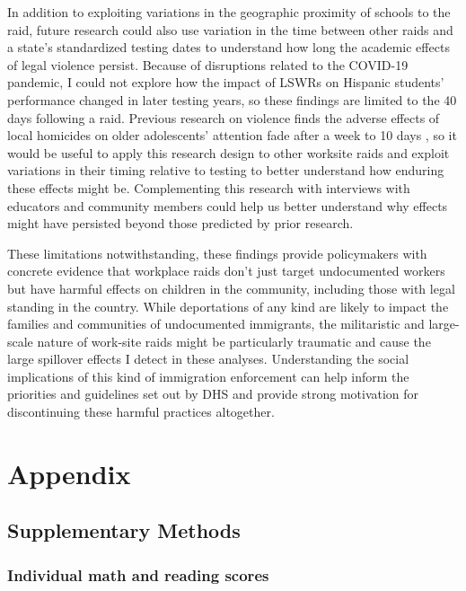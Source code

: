 \documentclass[hidelinks,twoside]{article}
\begin{document}
In addition to exploiting variations in the geographic proximity of schools to the raid, future research could also use variation in the time between other raids and a state's standardized testing dates to understand how long the academic effects of legal violence persist. Because of disruptions related to the COVID-19 pandemic, I could not explore how the impact of LSWRs on Hispanic students' performance changed in later testing years, so these findings are limited to the 40 days following a raid. Previous research on violence finds the adverse effects of local homicides on older adolescents' attention fade after a week to 10 days \citep{sharkey_2010_the}, so it would be useful to apply this research design to other worksite raids and exploit variations in their timing relative to testing to better understand how enduring these effects might be. Complementing this research with interviews with educators and community members could help us better understand why effects might have persisted beyond those predicted by prior research.

These limitations notwithstanding, these findings provide policymakers with concrete evidence that workplace raids don't just target undocumented workers but have harmful effects on children in the community, including those with legal standing in the country. While deportations of any kind are likely to impact the families and communities of undocumented immigrants, the militaristic and large-scale nature of work-site raids might be particularly traumatic and cause the large spillover effects I detect in these analyses. Understanding the social implications of this kind of immigration enforcement can help inform the priorities and guidelines set out by DHS and provide strong motivation for discontinuing these harmful practices altogether. 


\clearpage




\clearpage


\section*{Appendix}
\subsection*{Supplementary Methods}
\subsubsection*{Individual math and reading scores}
\end{document}

